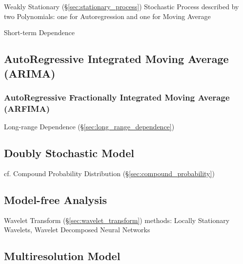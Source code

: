 Weakly Stationary (\S\ref{sec:stationary_process}) Stochastic Process described
by two Polynomials: one for Autoregression and one for Moving Average

Short-term Dependence



\subsection{AutoRegressive Integrated Moving Average (ARIMA)}\label{sec:arima}

\subsubsection{AutoRegressive Fractionally Integrated Moving Average (ARFIMA)}
\label{sec:arfima}

Long-range Dependence (\S\ref{sec:long_range_dependence})



\subsection{Doubly Stochastic Model}\label{sec:doubly_stochastic}

cf. Compound Probability Distribution (\S\ref{sec:compound_probability})



\subsection{Model-free Analysis}\label{sec:model_free_analysis}

Wavelet Transform (\S\ref{sec:wavelet_transform}) methods: Locally Stationary
Wavelets, Wavelet Decomposed Neural Networks



\subsection{Multiresolution Model}\label{sec:multiresolution_model}

